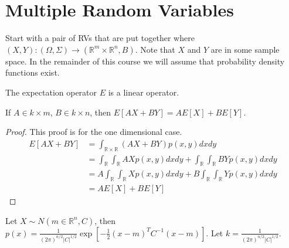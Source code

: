 \documentclass[lecture,12pt,]{pcms-l}
\begin{document}
\mainmatter
\setcounter{page}{1}

\lectureseries[\course]{\course}

\date{October 1, 2009}

\setaddress

\setcounter{lecture}{1}
\setcounter{chapter}{1}


\section{Multiple Random Variables}Start with a pair of RVs that are put together where $(X,Y):(\Omega,\Sigma) \to (\mathbb{R}^m\times \mathbb{R}^n,B)$. Note that $X$ and $Y$ are in some sample space. In the remainder of this course we will assume that probability density functions exist.

\begin{theorem}
\label{th:02expectationlo}
The expectation operator $E$ is a linear operator.

If $A\in k\times m$, $B\in k\times n$, then $E[AX+BY]=AE[X]+BE[Y]$.
\end{theorem}
\begin{proof}
This proof is for the one dimensional case.
\begin{align*}
E[AX+BY] &= \int_{\mathbb{R}\times\mathbb{R}}(AX+BY)p(x,y)dxdy \\
&= \int_{\mathbb{R}}\int_{\mathbb{R}}AXp(x,y)dxdy + \int_{\mathbb{R}}\int_{\mathbb{R}}BYp(x,y)dxdy \\
&= A\int_{\mathbb{R}}\int_{\mathbb{R}}Xp(x,y)dxdy + B\int_{\mathbb{R}}\int_{\mathbb{R}}Yp(x,y)dxdy \\
&= AE[X] + BE[Y]
\end{align*}
\end{proof}

Let $X\sim N(m\in\mathbb{R}^n,C)$, then $p(x)=\frac{1}{(2\pi)^{n/2}|C|^{1/2}}\exp\left[-\frac{1}{2}(x-m)^TC^{-1}(x-m)\right]$. Let $k=\frac{1}{(2\pi)^{n/2}|C|^{1/2}}$.
\end{document}
